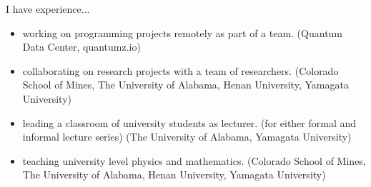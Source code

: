 I have experience...
%
\begin{itemize}
  \item working on programming projects remotely as part of a team. (Quantum Data Center, quantumz.io)
  \item collaborating on research projects with a team of researchers. (Colorado School of Mines, The University of Alabama, Henan University, Yamagata University)
  \item leading a classroom of university students as lecturer. (for either formal and informal lecture series) (The University of Alabama, Yamagata University)
  \item teaching university level physics and mathematics. (Colorado School of Mines, The University of Alabama, Henan University, Yamagata University)
\end{itemize}
